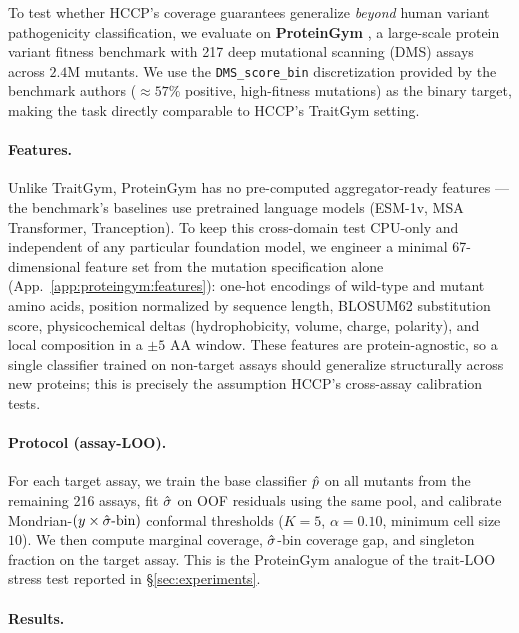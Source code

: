 
To test whether HCCP's coverage guarantees generalize \emph{beyond} human variant pathogenicity classification, we evaluate on \textbf{ProteinGym} \citep{notin2023proteingym}, a large-scale protein variant fitness benchmark with 217 deep mutational scanning (DMS) assays across $2.4$M mutants. We use the \texttt{DMS\_score\_bin} discretization provided by the benchmark authors ($\approx 57\%$ positive, high-fitness mutations) as the binary target, making the task directly comparable to HCCP's TraitGym setting.

\paragraph{Features.} Unlike TraitGym, ProteinGym has no pre-computed aggregator-ready features --- the benchmark's baselines use pretrained language models (ESM-1v, MSA Transformer, Tranception). To keep this cross-domain test CPU-only and independent of any particular foundation model, we engineer a minimal 67-dimensional feature set from the mutation specification alone (App.~\ref{app:proteingym:features}): one-hot encodings of wild-type and mutant amino acids, position normalized by sequence length, BLOSUM62 substitution score, physicochemical deltas (hydrophobicity, volume, charge, polarity), and local composition in a $\pm 5$ AA window. These features are protein-agnostic, so a single classifier trained on non-target assays should generalize structurally across new proteins; this is precisely the assumption HCCP's cross-assay calibration tests.

\paragraph{Protocol (assay-LOO).} For each target assay, we train the base classifier $\hat{p}$ on all mutants from the remaining 216 assays, fit $\hat{\sigma}$ on OOF residuals using the same pool, and calibrate Mondrian-$(y \times \hat{\sigma}\text{-bin})$ conformal thresholds ($K = 5$, $\alpha = 0.10$, minimum cell size $10$). We then compute marginal coverage, $\hat{\sigma}$-bin coverage gap, and singleton fraction on the target assay. This is the ProteinGym analogue of the trait-LOO stress test reported in §\ref{sec:experiments}.

\paragraph{Results.}
\label{app:proteingym:results}


